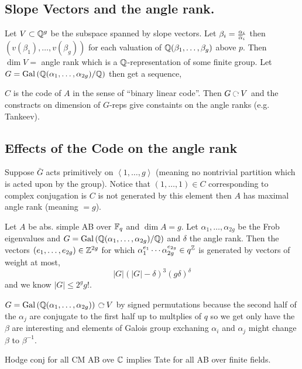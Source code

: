 \documentclass[12pt]{article}
\begin{document}
\subsection{Slope Vectors and the angle rank.}

Let $V \subset \mathbb{Q}^g$ be the subspace spanned by slope vectors. Let $\beta_i = \frac{\alpha_i}{\overline{\alpha}_i}$ then $(v(\beta_1), \dots, v(\beta_g))$ for each valuation of $\mathbb{Q}(\beta_1, \dots, \beta_g)$ above $p$. Then $\dim{V} = $ angle rank which is a $\mathbb{Q}$-representation of some finite group. Let $G = \mathrm{Gal}\left( \mathbb{Q}(\alpha_1, \dots, \alpha_{2g})/\mathbb{Q} \right)$ then get a sequence,
\begin{center}
\end{center}
$C$ is the code of $A$ in the sense of ``binary linear code''. Then $G \acts V$ and the constracts on dimension of $G$-reps give constaints on the angle ranks (e.g. Tankeev). 

\subsection{Effects of the Code on the angle rank}

\begin{thm}
Suppose $\bar{G}$ acts primitively on $\left< 1, \dots, g \right>$ (meaning no nontrivial partition which is acted upon by the group). Notice that $(1, \dots, 1) \in C$ corresponding to complex conjugation is $C$ is not generated by this element then $A$ has maximal angle rank (meaning $=g$). 
\end{thm}

\begin{thm}
Let $A$ be abs. simple AB over $\mathbb{F}_q$ and $\dim{A} = g$. Let $\alpha_1, \dots, \alpha_{2g}$ be the Frob eigenvalues and $G = \mathrm{Gal}\left( \mathbb{Q}(\alpha_1, \dots, \alpha_{2g})/\mathbb{Q} \right)$ and $\delta$ the angle rank. Then the vectors $(e_1, \dots, e_{2g}) \in \mathbb{Z}^{2g}$ for which $\alpha_1^{e_1} \cdots \alpha_{2g}^{e_{2g}} \in q^{\mathbb{Z}}$ is generated by vectors of weight at most,
\[ |G|(|G|-\delta)^3(g \delta)^\delta \]
and we know $|G| \le 2^g g!$. 
\end{thm}

$G = \Gal{\Q(\alpha_1, \dots, \alpha_{2g})} \acts V$ by signed permutations because the second half of the $\alpha_j$ are conjugate to the first half up to multplies of $q$ so we get only have the $\beta$ are interesting and elements of Galois group exchaning $\alpha_i$ and $\alpha_j$ might change $\beta$ to $\beta^{-1}$. 

\begin{thm}
Hodge conj for all CM AB ove $\mathbb{C}$ implies Tate for all AB over finite fields. 
\end{thm}
\end{document}
